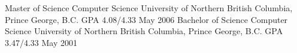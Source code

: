 %
%
%
%
%

\resumeeducation
{Master of Science}
{Computer Science}
{University of Northern British Columbia, Prince George, B.C.}
{GPA 4.08/4.33}
{May 2006}
\resumeeducation
{Bachelor of Science}
{Computer Science}
{University of Northern British Columbia, Prince George, B.C.}
{GPA 3.47/4.33}
{May 2001}

